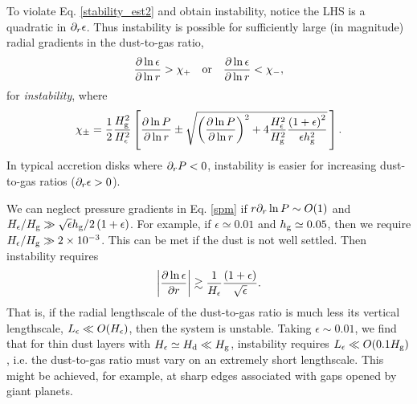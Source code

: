 
To violate Eq. \ref{stability_est2} and obtain instability, notice the 
LHS is a quadratic in $\partial_r\epsilon$. Thus instability is possible for
sufficiently large (in magnitude) radial gradients  in the dust-to-gas
ratio,  
\begin{align}
  \frac{\partial\ln{\epsilon}}{\partial\ln{r}} > \chi_+ \quad \mathrm{or} \quad 
  \frac{\partial\ln{\epsilon}}{\partial\ln{r}} < \chi_-,
\end{align}
for \emph{instability}, where
\begin{align}\label{spm}
\chi_\pm = \frac{1}{2}\frac{H_\mathrm{g}^2}{H_\epsilon^2} 
  \left[
  \frac{\partial\ln{P}}{\partial\ln{r}} \pm 
  \sqrt{
  \left(\frac{\partial\ln{P}}{\partial\ln{r}}\right)^2 + 
  4 \frac{H_\epsilon^2}{H_\mathrm{g}^2}
  \frac{\left(1+\epsilon\right)^2}{\epsilon h_\mathrm{g}^2}
  }
  \,\right]. 
\end{align} 
In typical accretion disks where $\partial_rP<0$, instability is easier
for increasing dust-to-gas ratios ($\partial_r\epsilon > 0$).  

We can neglect pressure gradients in Eq. \ref{spm} 
if $r\partial_r\ln{P}\sim O(1)$ and $H_\epsilon/H_\mathrm{g}\gg
\sqrt{\epsilon}h_\mathrm{g}/2\left(1+\epsilon\right)$. For example, if $\epsilon\simeq 0.01$ and
$h_\mathrm{g}\simeq 0.05$, then we require $H_\epsilon/H_\mathrm{g}\gg
2\times10^{-3}$. This can be met if the dust is not well settled. 
Then instability requires 
\begin{align}\label{dust_edge}
\left|\frac{\partial\ln{\epsilon}}{\partial r}\right| \gtrsim
  \frac{1}{H_\epsilon}\frac{\left(1+\epsilon\right)}{\sqrt{\epsilon}}.
\end{align}
That is, if the radial lengthscale of the dust-to-gas ratio 
is much less its vertical lengthscale, $L_\epsilon\ll O(H_\epsilon)$, 
then the system is  unstable.  
Taking $\epsilon\sim 0.01$,  we find that 
for thin dust layers with $H_\epsilon \simeq H_\mathrm{d}\ll H_\mathrm{g}$,  instability
requires $L_\epsilon\ll O(0.1H_\mathrm{g})$, i.e. the dust-to-gas ratio must 
vary on an extremely short lengthscale. This might be achieved, for
example, at sharp edges associated with gaps opened by giant planets. 


